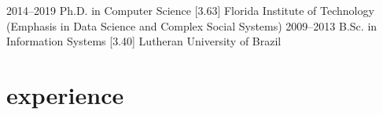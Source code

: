 \documentclass[]{cv-style}          %
\begin{document}
\begin{entrylist}
\entry
{2014--2019}
{Ph.D. {\normalfont in Computer Science [3.63]}}
{Florida Institute of Technology}
{(Emphasis in Data Science and Complex Social Systems)}
{\vspace{-0.3cm}}
\entry
{2009--2013}
{B.Sc. {\normalfont in Information Systems [3.40]}}
{Lutheran University of Brazil}
{\vspace{-0.4cm}}
\end{entrylist}


\section{experience}
\end{document}
